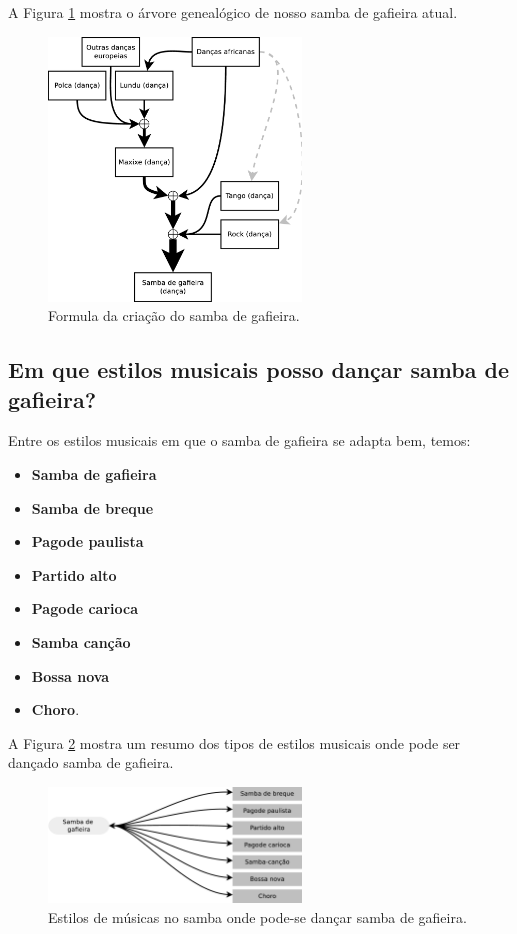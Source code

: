 A Figura \ref{fig:formuladosambagafieira} mostra o árvore genealógico de nosso samba de gafieira atual.
\begin{figure}[h]
  \centering
    \includegraphics[width=0.6\textwidth]{chapters/cap-historia/sambagafieiraformula.eps}
  \caption{Formula da criação do samba de gafieira.}
\label{fig:formuladosambagafieira}
\end{figure}

\subsection{Em que estilos musicais posso dançar samba de gafieira?}
\label{subsec:gafieiradancaestilos}

Entre os estilos musicais em que o samba de gafieira se adapta bem, temos:
\begin{itemize}
\item \textbf{Samba de gafieira}
\item \textbf{Samba de breque}
\item \textbf{Pagode paulista}
\item \textbf{Partido alto}
\item \textbf{Pagode carioca}
\item \textbf{Samba canção}
\item \textbf{Bossa nova}
\item \textbf{Choro}.
\end{itemize}

A Figura \ref{fig:gafieiradancaestilos} mostra um resumo dos 
tipos de estilos musicais onde pode ser dançado samba de gafieira.
\begin{figure}[h]
  \centering
    \includegraphics[width=0.6\textwidth]{chapters/cap-historia/gafieiravcmusica.eps}
  \caption{ Estilos de músicas no samba onde pode-se dançar samba de gafieira.}
\label{fig:gafieiradancaestilos}
\end{figure}


